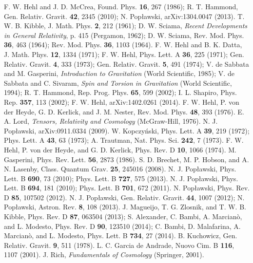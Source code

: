 \documentclass[prd,onecolumn,nofootinbib]{revtex4}
\begin{document}
\begin{thebibliography}{}
 F. W. Hehl and J. D. McCrea, Found. Phys. {\bf 16}, 267 (1986); R. T. Hammond, Gen. Relativ. Gravit. {\bf 42}, 2345 (2010); N. Pop{\l}awski, arXiv:1304.0047 (2013).
 T. W. B. Kibble, J. Math. Phys. {\bf 2}, 212 (1961); D. W. Sciama, {\em Recent Developments in General Relativity}, p. 415 (Pergamon, 1962); D. W. Sciama, Rev. Mod. Phys. {\bf 36}, 463 (1964); Rev. Mod. Phys. {\bf 36}, 1103 (1964).
 F. W. Hehl and B. K. Datta, J. Math. Phys. {\bf 12}, 1334 (1971); F. W. Hehl, Phys. Lett. A {\bf 36}, 225 (1971); Gen. Relativ. Gravit. {\bf 4}, 333 (1973); Gen. Relativ. Gravit. {\bf 5}, 491 (1974); V. de Sabbata and M. Gasperini, {\em Introduction to Gravitation} (World Scientific, 1985); V. de Sabbata and C. Sivaram, {\em Spin and Torsion in Gravitation} (World Scientific, 1994); R. T. Hammond, Rep. Prog. Phys. {\bf 65}, 599 (2002); I. L. Shapiro, Phys. Rep. {\bf 357}, 113 (2002); F. W. Hehl, arXiv:1402.0261 (2014).
 F. W. Hehl, P. von der Heyde, G. D. Kerlick, and J. M. Nester, Rev. Mod. Phys. {\bf 48}, 393 (1976).
 E. A. Lord, {\em Tensors, Relativity and Cosmology} (McGraw-Hill, 1976).
 N. J. Pop{\l}awski, arXiv:0911.0334 (2009).
 W. Kopczy\'{n}ski, Phys. Lett. A {\bf 39}, 219 (1972); Phys. Lett. A {\bf 43}, 63 (1973); A. Trautman, Nat. Phys. Sci. {\bf 242}, 7 (1973).
 F. W. Hehl, P. von der Heyde, and G. D. Kerlick, Phys. Rev. D {\bf 10}, 1066 (1974).
 M. Gasperini, Phys. Rev. Lett. {\bf 56}, 2873 (1986).
 S. D. Brechet, M. P. Hobson, and A. N. Lasenby, Class. Quantum Grav. {\bf 25}, 245016 (2008).
 N. J. Pop{\l}awski, Phys. Lett. B {\bf 690}, 73 (2010); Phys. Lett. B {\bf 727}, 575 (2013).
 N. J. Pop{\l}awski, Phys. Lett. B {\bf 694}, 181 (2010); Phys. Lett. B {\bf 701}, 672 (2011).
 N. Pop{\l}awski, Phys. Rev. D {\bf 85}, 107502 (2012).
 N. J. Pop{\l}awski, Gen. Relativ. Gravit. {\bf 44}, 1007 (2012); N. Pop{\l}awski, Astron. Rev. {\bf 8}, 108 (2013).
 J. Magueijo, T. G. Zlosnik, and T. W. B. Kibble, Phys. Rev. D {\bf 87}, 063504 (2013); S. Alexander, C. Bambi, A. Marcian\`{o}, and L. Modesto, Phys. Rev. D {\bf 90}, 123510 (2014); C. Bambi, D. Malafarina, A. Marcian\`{o}, and L. Modesto, Phys. Lett. B {\bf 734}, 27 (2014).
 B. Kuchowicz, Gen. Relativ. Gravit. {\bf 9}, 511 (1978).
 L. C. Garcia de Andrade, 
Nuovo Cim. B {\bf 116}, 1107 (2001).
 J. Rich, {\em Fundamentals of Cosmology} (Springer, 2001).

\end{thebibliography}
\end{document}

